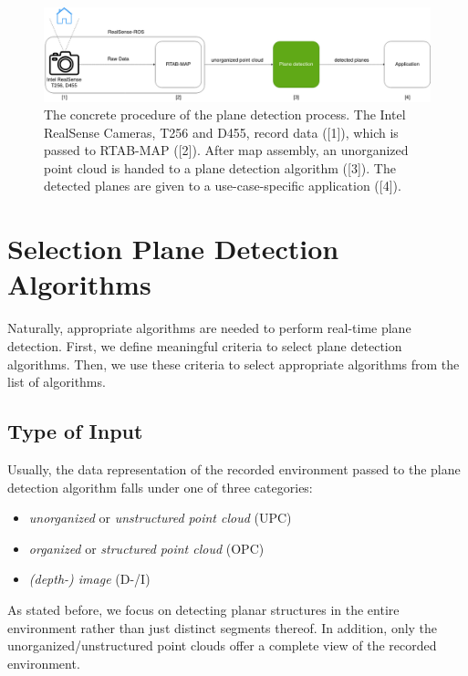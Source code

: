 \documentclass[main.tex]{subfiles}
\begin{document}
\begin{figure}[!ht]
    \centering
    \includegraphics[width=15 cm]{images/concept_specific.png}
    \caption{The concrete procedure of the plane detection process. The Intel RealSense Cameras, T256 and D455, record data ([1]), which is passed to 
    RTAB-MAP ([2]). After map assembly, an unorganized point cloud is handed to a plane detection algorithm ([3]). 
    The detected planes are given to a use-case-specific application ([4]).}
    \label{fig:concept_spec}
\end{figure}

\section{Selection Plane Detection Algorithms}
Naturally, appropriate algorithms are needed to perform real-time plane detection.
First, we define meaningful criteria to select plane detection algorithms. Then, we use these criteria to select appropriate algorithms from the list of algorithms.

\subsection*{Type of Input}
Usually, the data representation of the recorded environment passed to the plane detection algorithm falls under one of three categories:
\begin{itemize}
    \item \textit{unorganized} or \textit{unstructured point cloud} (UPC)
    \item \textit{organized} or \textit{structured point cloud} (OPC)
    \item \textit{(depth-) image} (D-/I)
\end{itemize}

As stated before, we focus on detecting planar structures in the entire environment rather than just distinct segments thereof.
In addition, only the unorganized/unstructured point clouds offer a complete view of the recorded environment.
\end{document}
